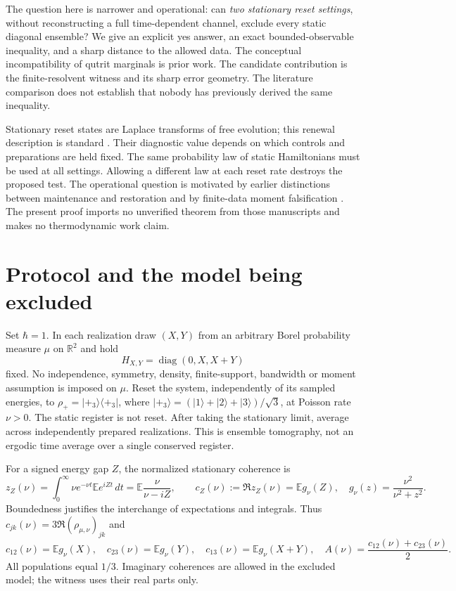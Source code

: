 \documentclass[11pt,a4paper]{article}
\newcommand{\E}{\mathbb E}
\newcommand{\R}{\mathbb R}
\newcommand{\diag}{\operatorname{diag}}
\begin{document}
The question here is narrower and operational: can \emph{two stationary
reset settings}, without reconstructing a full time-dependent channel,
exclude every static diagonal ensemble? We give an explicit yes answer,
an exact bounded-observable inequality, and a sharp distance to the
allowed data. The conceptual incompatibility of qutrit marginals is
prior work. The candidate contribution is the finite-resolvent witness
and its sharp error geometry. The literature comparison does not
establish that nobody has previously derived the same inequality.

Stationary reset states are Laplace transforms of free evolution; this
renewal description is standard \cite{rose}. Their diagnostic value
depends on which controls and preparations are held fixed. The same
probability law of static Hamiltonians must be used at all settings.
Allowing a different law at each reset rate destroys the proposed test.
The operational question is motivated by earlier distinctions between
maintenance and restoration \cite{eriksson-maintenance} and by
finite-data moment falsification \cite{eriksson-moments}. The present
proof imports no unverified theorem from those manuscripts and makes
no thermodynamic work claim.

\section{Protocol and the model being excluded}
Set $\hbar=1$. In each realization draw $(X,Y)$ from an arbitrary Borel
probability measure $\mu$ on $\R^2$ and hold
\begin{equation}\label{eq:H}
 H_{X,Y}=\diag(0,X,X+Y)
\end{equation}
fixed. No independence, symmetry, density, finite-support, bandwidth or
moment assumption is imposed on $\mu$.
Reset the system, independently of its sampled energies, to
$\rho_+=|+_3\rangle\langle+_3|$, where
$|+_3\rangle=(|1\rangle+|2\rangle+|3\rangle)/\sqrt3$, at Poisson
rate $\nu>0$. The static register is not reset. After taking the
stationary limit, average across independently prepared realizations.
This is ensemble tomography, not an ergodic time average over a single
conserved register.

For a signed energy gap $Z$, the normalized stationary coherence is
\begin{equation}\label{eq:renewal}
 z_Z(\nu)=\int_0^\infty\nu e^{-\nu t}\E e^{iZt}\,dt
 =\E\frac{\nu}{\nu-iZ},\qquad
 c_Z(\nu):=\Re z_Z(\nu)=\E g_\nu(Z),
 \quad g_\nu(z)=\frac{\nu^2}{\nu^2+z^2}.
\end{equation}
Boundedness justifies the interchange of expectations and integrals.
Thus $c_{jk}(\nu)=3\Re(\rho_{\mu,\nu})_{jk}$ and
\begin{equation}\label{eq:features}
 c_{12}(\nu)=\E g_\nu(X),\quad
 c_{23}(\nu)=\E g_\nu(Y),\quad
 c_{13}(\nu)=\E g_\nu(X+Y),\quad
 A(\nu)=\frac{c_{12}(\nu)+c_{23}(\nu)}2.
\end{equation}
All populations equal $1/3$. Imaginary coherences are allowed in the
excluded model; the witness uses their real parts only.
\end{document}
